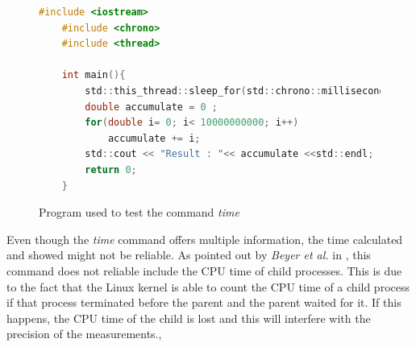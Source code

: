 \begin{figure}[h]
\begin{lstlisting}[language=c]
    #include <iostream>
    #include <chrono>
    #include <thread>
    
    int main(){
        std::this_thread::sleep_for(std::chrono::milliseconds(1000));
        double accumulate = 0 ;
        for(double i= 0; i< 10000000000; i++)
            accumulate += i;
        std::cout << "Result : "<< accumulate <<std::endl;  
        return 0;
    }
\end{lstlisting}
\caption{Program used to test the command \textit{time}}
\label{fig:time_code_cpp}
\end{figure}


Even though the \textit{time} command offers multiple information, the time calculated and showed might not be reliable. As pointed out by \textit{Beyer et al.} in \cite{Beyer2017ReliableBR}, this command does not reliable include the CPU time of child processes. This is due to the fact that the Linux kernel is able to count the CPU time of a child process if that process terminated before the parent and the parent waited for it. If this happens, the CPU time of the child is lost and this will interfere with the precision of the measurements.\cite{Beyer2017ReliableBR},\\ \hfill

